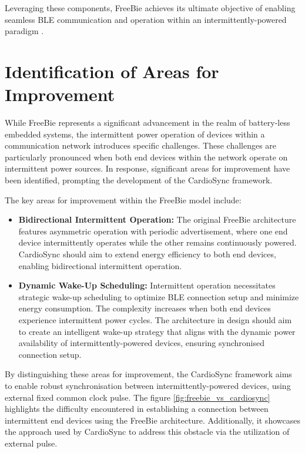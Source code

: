 \noindent Leveraging these components, FreeBie achieves its ultimate objective of enabling seamless BLE communication and operation within an intermittently-powered paradigm \cite{de2022Intermittently}.

\section{Identification of Areas for Improvement}
While FreeBie represents a significant advancement in the realm of battery-less embedded systems, the intermittent power operation of devices within a communication network introduces specific challenges. These challenges are particularly pronounced when both end devices within the network operate on intermittent power sources. In response, significant areas for improvement have been identified, prompting the development of the CardioSync framework.

\noindent The key areas for improvement within the FreeBie model include:

\begin{itemize}
    \item \textbf{Bidirectional Intermittent Operation:} The original FreeBie architecture features asymmetric operation with periodic advertisement, where one end device intermittently operates while the other remains continuously powered. CardioSync should aim to extend energy efficiency to both end devices, enabling bidirectional intermittent operation.
    
    \item \textbf{Dynamic Wake-Up Scheduling:} Intermittent operation necessitates strategic wake-up scheduling to optimize BLE connection setup and minimize energy consumption. The complexity increases when both end devices experience intermittent power cycles. The architecture in design should aim to create an intelligent wake-up strategy that aligns with the dynamic power availability of intermittently-powered devices, ensuring synchronised connection setup.

\end{itemize}

\noindent By distinguishing these areas for improvement, the CardioSync framework aims to enable robust synchronisation between intermittently-powered devices, using external fixed common clock pulse. The figure \ref{fig:freebie_vs_cardiosync} highlights the difficulty encountered in establishing a connection between intermittent end devices using the FreeBie architecture. Additionally, it showcases the approach used by CardioSync to address this obstacle via the utilization of external pulse.

